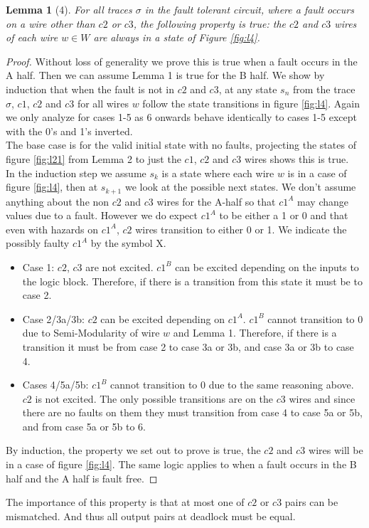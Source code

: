 \documentclass[12pt]{report}
\newtheorem*{lemma}{Lemma}
\begin{document}
\begin{lemma}[4]
For all traces $\sigma$ in the fault tolerant circuit, where a fault occurs on a wire other than $c2$ or $c3$, the following property is true: the $c2$ and $c3$ wires of each wire $w\in W$ are always in a state of Figure \ref{fig:l4}.
\end{lemma}
\begin{proof}
Without loss of generality we prove this is true when a fault occurs in the A half.  Then we can assume Lemma 1 is true for the B half.  We show by induction that when the fault is not in $c2$ and $c3$, at any state $s_n$ from the trace $\sigma$, $c1$, $c2$ and $c3$ for all wires $w$ follow the state transitions in figure \ref{fig:l4}.  Again we only analyze for cases 1-5 as 6 onwards behave identically to cases 1-5 except with the 0's and 1's inverted.\\

The base case is for the valid initial state with no faults, projecting the states of figure \ref{fig:l21} from Lemma 2 to just the $c1$, $c2$ and $c3$ wires shows this is true. \\

In the induction step we assume $s_k$ is a state where each wire $w$ is in a case of figure \ref{fig:l4}, then at $s_{k+1}$ we look at the possible next states.  We don't assume anything about the non $c2$ and $c3$ wires for the A-half so that $c1^A$ may change values due to a fault.  However we do expect $c1^A$ to be either a 1 or 0 and that even with hazards on $c1^A$, $c2$ wires transition to either 0 or 1.  We indicate the possibly faulty $c1^A$ by the symbol X.
\begin{itemize}
	\item
Case 1:  $c2$, $c3$ are not excited.  $c1^B$ can be excited depending on the inputs to the logic block.  Therefore, if there is a transition from this state it must be to case 2.
\item
Case 2/3a/3b:  $c2$ can be excited depending on $c1^A$.  $c1^B$ cannot transition to 0 due to Semi-Modularity of wire $w$ and Lemma 1.  Therefore, if there is a transition it must be from case 2 to case 3a or 3b, and case 3a or 3b to case 4.
\item
Cases 4/5a/5b:  $c1^B$ cannot transition to 0 due to the same reasoning above.  $c2$ is not excited. The only possible transitions are on the $c3$ wires and since there are no faults on them they must transition from case 4 to case 5a or 5b, and from case 5a or 5b to 6.
\end{itemize}
By induction, the property we set out to prove is true, the $c2$ and $c3$ wires will be in a case of figure \ref{fig:l4}. 
The same logic applies to when a fault occurs in the B half and the A half is fault free.  
\end{proof}
The importance of this property is that at most one of $c2$ or $c3$ pairs can be mismatched.  And thus all output pairs at deadlock must be equal.
\end{document}
